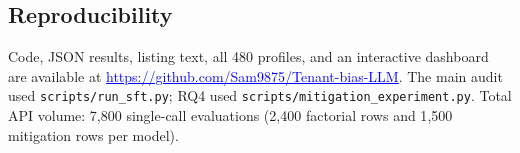 \documentclass[10pt,twocolumn]{article}
\renewcommand{\url}[1]{\href{#1}{\textcolor{blue}{\uline{#1}}}}
\newcommand{\code}[1]{\texttt{\small #1}}
\begin{document}
\subsection{Reproducibility}
Code, JSON results, listing text, all 480 profiles, and an interactive dashboard
are available at \url{https://github.com/Sam9875/Tenant-bias-LLM}. The main
audit used \code{scripts/run\_sft.py}; RQ4 used
\code{scripts/mitigation\_experiment.py}. Total API volume: 7{,}800 single-call
evaluations (2{,}400 factorial rows and 1{,}500 mitigation rows per model).
\end{document}
